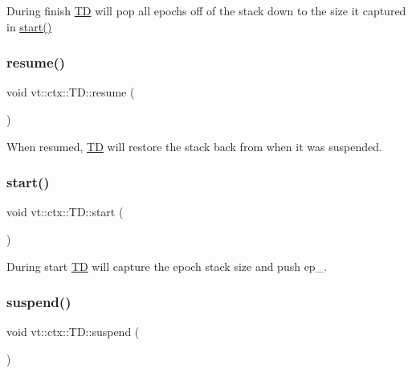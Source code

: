 During finish {\ttfamily \hyperlink{structvt_1_1ctx_1_1_t_d}{TD}} will pop all epochs off of the stack down to the size it captured in {\ttfamily \hyperlink{structvt_1_1ctx_1_1_t_d_a648eebf5cd551a0917f7a304b03da05d}{start()}} 

\mbox{\label{structvt_1_1ctx_1_1_t_d_a0092946ebad71b2518fa8fa5a7eeb3f2}} 
\subsubsection{\texorpdfstring{resume()}{resume()}}
{\footnotesize\ttfamily void vt\+::ctx\+::\+T\+D\+::resume (\begin{DoxyParamCaption}{ }\end{DoxyParamCaption})}



When resumed, {\ttfamily \hyperlink{structvt_1_1ctx_1_1_t_d}{TD}} will restore the stack back from when it was suspended. 

\mbox{\label{structvt_1_1ctx_1_1_t_d_a648eebf5cd551a0917f7a304b03da05d}} 
\subsubsection{\texorpdfstring{start()}{start()}}
{\footnotesize\ttfamily void vt\+::ctx\+::\+T\+D\+::start (\begin{DoxyParamCaption}{ }\end{DoxyParamCaption})}



During start {\ttfamily \hyperlink{structvt_1_1ctx_1_1_t_d}{TD}} will capture the epoch stack size and push {\ttfamily ep\+\_\+}. 

\mbox{\label{structvt_1_1ctx_1_1_t_d_ab66a4c01265c0c43d95d0084ea8c5ff9}} 
\subsubsection{\texorpdfstring{suspend()}{suspend()}}
{\footnotesize\ttfamily void vt\+::ctx\+::\+T\+D\+::suspend (\begin{DoxyParamCaption}{ }\end{DoxyParamCaption})}



